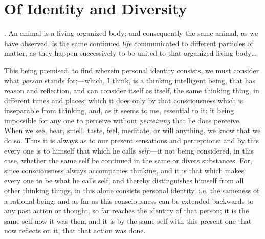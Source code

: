 
\author{John Locke}
\chapter[Of Identity and Diversity, excerpt]{Of Identity and Diversity}

. An animal is a living organized body; and
consequently the same animal, as we have observed, is the same
continued \textit{life} communicated to different particles of matter,
as they happen successively to be united to that organized living
body\ldots

This being premised, to find wherein personal
identity consists, we must consider what \textit{person} stands
for;---which, I think, is a thinking intelligent being, that has
reason and reflection, and can consider itself as itself, the same
thinking thing, in different times and places; which it does only by
that consciousness which is inseparable from thinking, and, 
as it seems to me, essential to it: it being impossible for any one
to perceive without \textit{perceiving} that he does perceive. When we
see, hear, smell, taste, feel, meditate, or will anything, we know
that we do so. Thus it is always as to our present sensations and
perceptions: and by this every one is to himself that which he calls
\textit{self}:---it not being considered, in this case, whether the
same self be continued in the same or divers substances. For, since
consciousness always accompanies thinking, and it is that which
makes every one to be what he calls self, and thereby distinguishes
himself from all other thinking things, in this alone consists
personal identity, i.e. the sameness of a rational being: and as far
as this consciousness can be extended backwards to any past action or
thought, so far reaches the identity of that person; it is the same
self now it was then; and it is by the same self with this present one
that now reflects on it, that that action was done.


